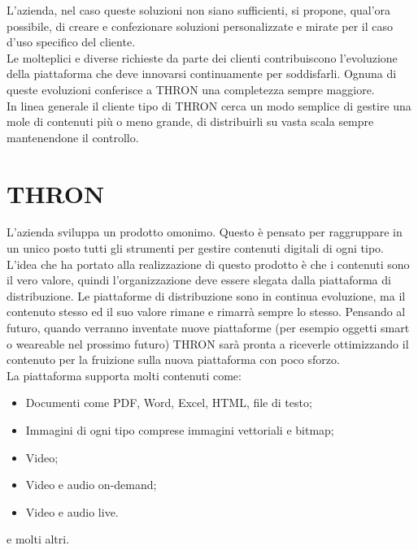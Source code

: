 \documentclass[a4paper, 12pt, twoside, openright]{book}
\begin{document}
L'azienda, nel caso queste soluzioni non siano sufficienti, si propone, qual'ora possibile, di creare e confezionare soluzioni personalizzate e mirate per il caso d'uso specifico del cliente.\\

Le molteplici e diverse richieste da parte dei clienti contribuiscono l'evoluzione della piattaforma che deve innovarsi continuamente per soddisfarli. Ognuna di queste evoluzioni conferisce a THRON una completezza sempre maggiore.\\

In linea generale il cliente tipo di THRON cerca un modo semplice di gestire una mole di contenuti più o meno grande, di distribuirli su vasta scala sempre mantenendone il controllo.\\

\newpage{}
\section{THRON}
L'azienda sviluppa un prodotto omonimo. Questo è pensato per raggruppare in un unico posto tutti gli strumenti per gestire contenuti digitali di ogni tipo.\\
L'idea che ha portato alla realizzazione di questo prodotto è che i contenuti sono il vero valore, quindi l'organizzazione deve essere slegata dalla piattaforma di distribuzione. Le piattaforme di distribuzione sono in continua evoluzione, ma il contenuto stesso ed il suo valore rimane e rimarrà sempre lo stesso. Pensando al futuro, quando verranno inventate nuove piattaforme (per esempio oggetti smart o weareable nel prossimo futuro) THRON sarà pronta a riceverle ottimizzando il contenuto per la fruizione sulla nuova piattaforma con poco sforzo.\\
La piattaforma supporta molti contenuti come:
\begin{itemize}
\item Documenti come PDF, Word, Excel, HTML, file di testo;
\item Immagini di ogni tipo comprese immagini vettoriali e bitmap;
\item Video;
\item Video e audio on-demand;
\item Video e audio live.
\end{itemize}
e molti altri.\\
\end{document}
